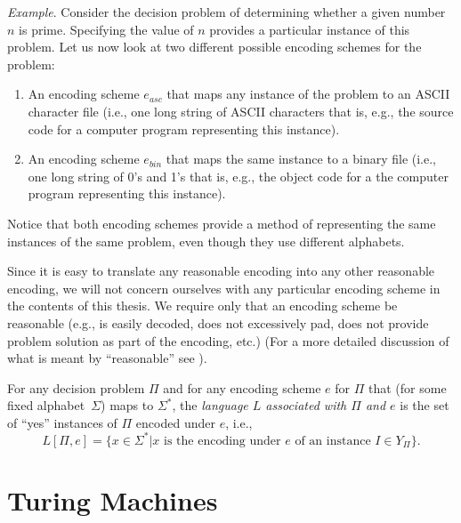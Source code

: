 \noindent
{\em Example}. Consider the decision problem of determining whether a given
number $n$ is prime.  Specifying the value of $n$ provides a particular
instance of this problem.  Let us now look at two different possible encoding
schemes for the problem:
\begin{enumerate}
\item An encoding scheme $e_{asc}$ that maps any instance of the problem to
      an ASCII character file (i.e., one long string of ASCII characters that
      is, e.g., the source code for a computer program representing this
      instance).
\item An encoding scheme $e_{bin}$ that maps the same instance to a binary
      file (i.e., one long string of 0's and 1's that is, e.g., the object
      code for a the computer program representing this instance).
\end{enumerate}
Notice that both encoding schemes provide a method of representing the same
instances of the same problem, even though they use different alphabets.

Since it is easy to translate any reasonable encoding into
any other reasonable encoding, we will not concern ourselves with any
particular encoding scheme in the contents of this thesis.  We require only
that an encoding scheme be reasonable (e.g., is easily decoded, does not
excessively pad, does not provide problem solution as part of the encoding,
etc.) (For a more detailed discussion of what is meant by ``reasonable'' see
\cite{Garey1979}).

\begin{definition}
{\rm For any decision problem $\Pi$ and for any encoding scheme $e$ for $\Pi$
that (for some fixed alphabet~$\Sigma$) maps to $\Sigma^*$, the {\em language
$L$ associated with $\Pi$ and $e$\/} is the set of ``yes'' instances of $\Pi$
encoded under $e$, i.e.,
$$
  L[\Pi,e]=\{x\in\Sigma^*|\mbox{$x$ is the encoding under $e$ of an instance
   $I\in Y_\Pi$}\}.
$$}
\end{definition}

\section{Turing Machines}

